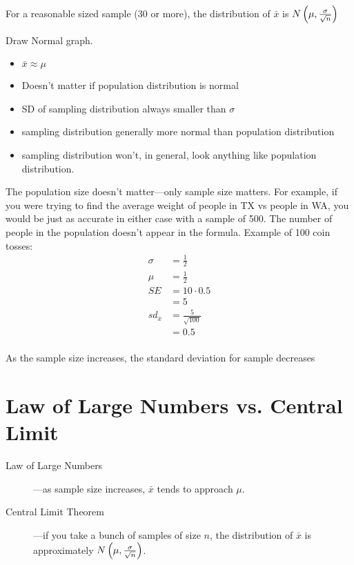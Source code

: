\documentclass[letterpaper,landscape]{exam}
\begin{document}
  For a reasonable sized sample (30 or more), the distribution of $\bar{x}$ is
  $N\del{ \mu, \frac{\sigma}{\sqrt{n}} }$

  Draw Normal graph.

  \begin{itemize}
    \item $\bar{x} \approx \mu$

    \item Doesn't matter if population distribution is normal 

    \item SD of sampling distribution always smaller than $\sigma$

    \item sampling distribution generally more normal than population distribution

    \item sampling distribution won't, in general, look anything like population
      distribution. 

  \end{itemize}

  The population size doesn't matter---only sample size matters. For example, if
  you were trying to find the average weight of people in TX vs people in WA,
  you would be just as accurate in either case with a sample of 500. The number
  of people in the population doesn't appear in the formula.
  Example of 100 coin tosses:
  \begin{align*}
    \sigma        & = \frac{1}{2} \\
    \mu           & = \frac{1}{2} \\
    SE            & = 10 \cdot 0.5 \\
                  & = 5 \\
     sd_{\bar{x}} & = \frac{5}{\sqrt{100}} \\
                  & = 0.5 \\
  \end{align*}

  As the sample size increases, the standard deviation for sample decreases
  
  \section{Law of Large Numbers vs. Central Limit}

  \begin{description}
    \item[Law of Large Numbers]---as sample size increases, $\bar{x}$ tends to
      approach $\mu$. 

    \item[Central Limit Theorem]---if you take a bunch of samples of size
      $n$, the distribution of $\bar{x}$ is approximately 
      $N \del{ \mu, \frac{\sigma}{ \sqrt{n} } }$. 
      
  \end{description}
\end{document}
